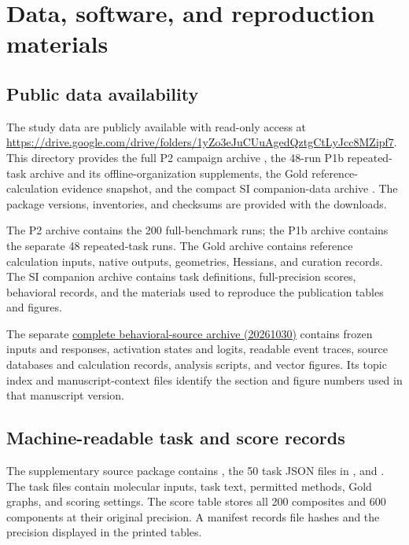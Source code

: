 \section{Data, software, and reproduction materials}
\label{sec:si-reproduction}
\subsection{Public data availability}
The study data are publicly available with read-only access at \url{https://drive.google.com/drive/folders/1yZo3eJuCUuAgedQztgCtLyJcc8MZipf7}. This directory provides the full P2 campaign archive , the 48-run P1b repeated-task archive and its offline-organization supplements, the Gold reference-calculation evidence snapshot, and the compact SI companion-data archive . The package versions, inventories, and checksums are provided with the downloads.

The P2 archive contains the 200 full-benchmark runs; the P1b archive contains the separate 48 repeated-task runs. The Gold archive contains reference calculation inputs, native outputs, geometries, Hessians, and curation records. The SI companion archive contains task definitions, full-precision scores, behavioral records, and the materials used to reproduce the publication tables and figures.

The separate \href{https://drive.google.com/drive/folders/1Zkn6_2aDlloAe-bmfd7w27zxmQKj5L9K}{complete behavioral-source archive (20261030)} contains frozen inputs and responses, activation states and logits, readable event traces, source databases and calculation records, analysis scripts, and vector figures. Its topic index and manuscript-context files identify the section and figure numbers used in that manuscript version.

\subsection{Machine-readable task and score records}
The supplementary source package contains , the 50 task JSON files in , and . The task files contain molecular inputs, task text, permitted methods, Gold graphs, and scoring settings. The score table stores all 200 composites and 600 components at their original precision. A manifest records file hashes and the precision displayed in the printed tables.

